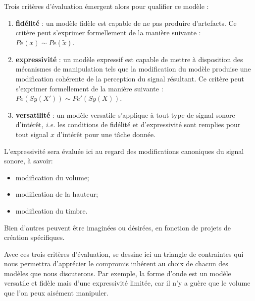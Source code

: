 Trois critères d'évaluation émergent alors pour qualifier ce modèle :
\begin{enumerate}
  \item \textbf{fidélité} : un modèle fidèle est capable de ne pas produire d'artefacts. Ce critère peut s'exprimer formellement de la manière suivante : $Pe(x) \sim Pe(\tilde{x})$.
  \item \textbf{expressivité} : un modèle expressif est capable de mettre à disposition des mécanismes de manipulation tels que la modification du modèle produise une modification cohérente de la perception du signal résultant. Ce critère peut s'exprimer formellement de la manière suivante : $Pe(Sy(X')) \sim Pe'(Sy(X))$.
  \item \textbf{versatilité} : un modèle versatile s'applique à tout type de signal sonore d'intérêt, \textit{i.e.} les conditions de fidélité et d'expressivité sont remplies pour tout signal $x$ d'intérêt pour une tâche donnée.
\end{enumerate}

L'expressivité sera évaluée ici au regard des modifications canoniques du signal sonore, à savoir:
\begin{itemize}
  \item modification du volume;
  \item modification de la hauteur;
  \item modification du timbre.
\end{itemize}
Bien d'autres peuvent être imaginées ou désirées, en fonction de projets de création spécifiques.

Avec ces trois critères d'évaluation, se dessine ici un triangle de contraintes qui nous permettra d'apprécier le compromis inhérent au choix  de chacun des modèles que nous discuterons. Par exemple, la forme d'onde est un modèle versatile et fidèle mais d'une expressivité limitée, car il n'y a guère que le volume que l'on peux aisément manipuler.

